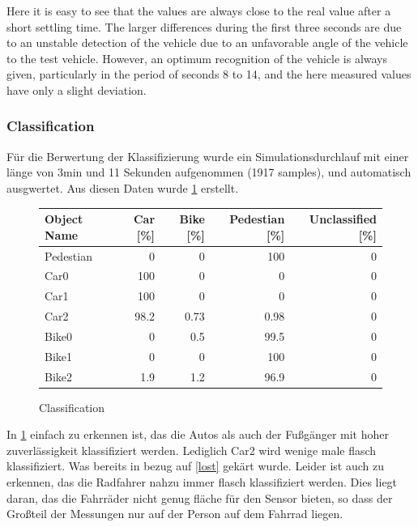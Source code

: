 \documentclass[11pt,oneside,openright]{mpreport}
\begin{document}
Here it is easy to see that the values are always close to the real value after a short settling time. The larger differences during the first three seconds are due to an unstable detection
of the vehicle due to an unfavorable angle of the vehicle to the test vehicle. However, an optimum recognition of the vehicle is always given, particularly in the period of seconds 8 to 14,
and the here measured values have only a slight deviation.


\subsubsection{Classification}
Für die Berwertung der Klassifizierung wurde ein Simulationsdurchlauf mit einer länge von 3min und 11 Sekunden aufgenommen (1917 samples), und automatisch ausgwertet.
Aus diesen Daten wurde \cref{classification} erstellt.

\begin{figure}[!htb]
  \caption{Classification} 
  \centering
  \begin{tabularx}{\textwidth}{X|r|r|r|r}
  \hline \textbf{Object Name} & \textbf{Car [\%]} & \textbf{Bike [\%]} & \textbf{Pedestian [\%]} & \textbf{Unclassified [\%]} \\\hline
    Pedestian & 0 & 0 & 100 & 0 \\\hline
    Car0 & 100 & 0 & 0 & 0 \\\hline
    Car1 & 100 & 0 & 0 & 0 \\\hline
    Car2 & 98.2 & 0.73 & 0.98 & 0 \\\hline
    Bike0 & 0 & 0.5 & 99.5 & 0 \\\hline
    Bike1 & 0 & 0 & 100 & 0 \\\hline
    Bike2 & 1.9 & 1.2 & 96.9 & 0 \\
  \end{tabularx}
 \label{classification}
\end{figure}




In \cref{classification} einfach zu erkennen ist, das die Autos als auch der Fußgänger mit hoher zuverlässigkeit klassifiziert werden. Lediglich Car2 wird wenige male flasch klassifiziert.
Was bereits in bezug auf \cref{lost} gekärt wurde. Leider ist auch zu erkennen, das die Radfahrer nahzu immer flasch klassifiziert werden. Dies liegt daran,
das die Fahrräder nicht genug fläche für den Sensor bieten, so dass der Großteil der Messungen nur auf der Person auf dem Fahrrad liegen.
\end{document}
